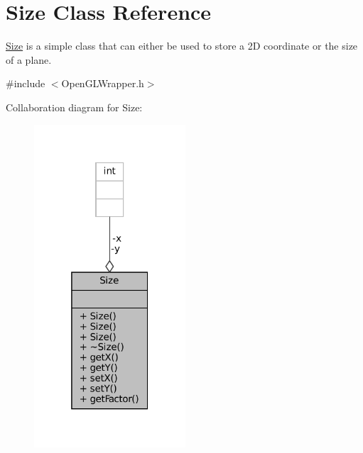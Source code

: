 \hypertarget{classSize}{}\section{Size Class Reference}
\label{classSize}


\mbox{\hyperlink{classSize}{Size}} is a simple class that can either be used to store a 2D coordinate or the size of a plane.  




{\ttfamily \#include $<$Open\+G\+L\+Wrapper.\+h$>$}



Collaboration diagram for Size\+:\nopagebreak
\begin{figure}[H]
\begin{center}
\leavevmode
\includegraphics[width=160pt]{classSize__coll__graph}
\end{center}
\end{figure}
